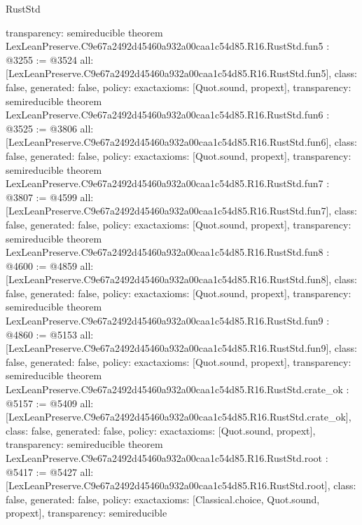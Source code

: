 \begin{lexlean}{RustStd}
\begin{coremodule}
{  transparency: semireducible
}
theorem LexLeanPreserve.C9e67a2492d45460a932a00caa1c54d85.R16.RustStd.fun5 : @3255 := @3524 {
  all: [LexLeanPreserve.C9e67a2492d45460a932a00caa1c54d85.R16.RustStd.fun5],
  class: false,
  generated: false,
  policy: exact{axioms: [Quot.sound, propext]},
  transparency: semireducible
}
theorem LexLeanPreserve.C9e67a2492d45460a932a00caa1c54d85.R16.RustStd.fun6 : @3525 := @3806 {
  all: [LexLeanPreserve.C9e67a2492d45460a932a00caa1c54d85.R16.RustStd.fun6],
  class: false,
  generated: false,
  policy: exact{axioms: [Quot.sound, propext]},
  transparency: semireducible
}
theorem LexLeanPreserve.C9e67a2492d45460a932a00caa1c54d85.R16.RustStd.fun7 : @3807 := @4599 {
  all: [LexLeanPreserve.C9e67a2492d45460a932a00caa1c54d85.R16.RustStd.fun7],
  class: false,
  generated: false,
  policy: exact{axioms: [Quot.sound, propext]},
  transparency: semireducible
}
theorem LexLeanPreserve.C9e67a2492d45460a932a00caa1c54d85.R16.RustStd.fun8 : @4600 := @4859 {
  all: [LexLeanPreserve.C9e67a2492d45460a932a00caa1c54d85.R16.RustStd.fun8],
  class: false,
  generated: false,
  policy: exact{axioms: [Quot.sound, propext]},
  transparency: semireducible
}
theorem LexLeanPreserve.C9e67a2492d45460a932a00caa1c54d85.R16.RustStd.fun9 : @4860 := @5153 {
  all: [LexLeanPreserve.C9e67a2492d45460a932a00caa1c54d85.R16.RustStd.fun9],
  class: false,
  generated: false,
  policy: exact{axioms: [Quot.sound, propext]},
  transparency: semireducible
}
theorem LexLeanPreserve.C9e67a2492d45460a932a00caa1c54d85.R16.RustStd.crate_ok : @5157 := @5409 {
  all: [LexLeanPreserve.C9e67a2492d45460a932a00caa1c54d85.R16.RustStd.crate_ok],
  class: false,
  generated: false,
  policy: exact{axioms: [Quot.sound, propext]},
  transparency: semireducible
}
theorem LexLeanPreserve.C9e67a2492d45460a932a00caa1c54d85.R16.RustStd.root : @5417 := @5427 {
  all: [LexLeanPreserve.C9e67a2492d45460a932a00caa1c54d85.R16.RustStd.root],
  class: false,
  generated: false,
  policy: exact{axioms: [Classical.choice, Quot.sound, propext]},
  transparency: semireducible
}


\end{coremodule}
\end{lexlean}
